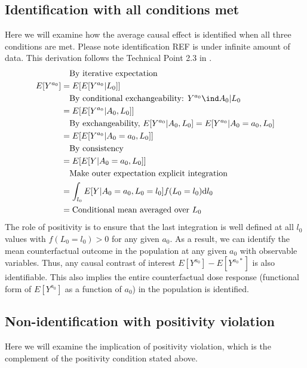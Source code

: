 \documentclass[dvipdfmx,10pt]{article}
\begin{document}
\subsection{Identification with all conditions met}
\label{sec:orgdc39369}
Here we will examine how the average causal effect is identified when all three conditions are met. Please note identification REF is under infinite amount of data. This derivation follows the Technical Point 2.3 in \cite{hernanCausalInference2019}.
\begin{align*}
  &~~~\text{By iterative expectation}\\
  E[Y^{a_{0}}]
  &= E[E[Y^{a_{0}} | L_{0}]]\\
  &~~~\text{By conditional exchangeability: } Y^{a_{0}} \ind A_{0} | L_{0}\\
  &= E[E[Y^{a_{0}} | A_{0}, L_{0}]]\\
  &~~~\text{By exchangeability, }E[Y^{a_{0}} | A_{0}, L_{0}] = E[Y^{a_{0}} | A_{0} = a_{0}, L_{0}]\\
  &= E[E[Y^{a_{0}} | A_{0} = a_{0}, L_{0}]]\\
  &~~~\text{By consistency}\\
  &= E[E[Y | A_{0} = a_{0}, L_{0}]]\\
  &~~~\text{Make outer expectation explicit integration}\\
  &= \int_{l_{0}} E[Y | A_{0} = a_{0}, L_{0} = l_{0}] f(L_{0} = l_{0}) \text{d}l_{0}\\
  &= \text{Conditional mean averaged over $L_{0}$}\\
\end{align*}
The role of positivity is to ensure that the last integration is well defined at all \(l_{0}\) values with \(f(L_{0} = l_{0}) > 0\) for any given \(a_{0}\). As a result, we can identify the mean counterfactual outcome in the population at any given \(a_{0}\) with observable variables. Thus, any causal contrast of interest \(E[Y^{a_{0}}] - E[Y^{a_{0}*}]\) is also identifiable. This also implies the entire counterfactual dose response (functional form of \(E[Y^{a_{0}}]\) as a function of \(a_{0}\)) in the population is identified.

\subsection{Non-identification with positivity violation}
\label{sec:org2cd9c47}
Here we will examine the implication of positivity violation, which is the complement of the positivity condition stated above.
\end{document}

